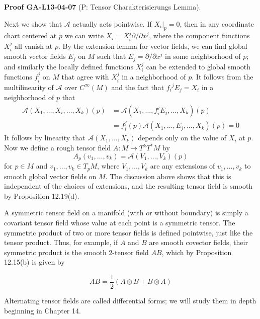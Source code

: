 \documentclass[10pt, letterpaper]{article}
\newcommand{\CustomHeading}[3]{%
  \par\medskip\noindent%
  \textbf{#1 #2} \textnormal{(#3)}.\enskip%
}
\newenvironment{PROOF}[2]{\begin{unitbox}\CustomHeading{Proof}{#1}{#2}}{\end{unitbox}}
\begin{document}
\begin{PROOF}{GA-L13-04-07}{P: Tensor Charakterisierungs Lemma}
Next we show that $\mathscr{A}$ actually acts pointwise. If $\left.X_{i}\right|_{p}=0$, then in any coordinate chart centered at $p$ we can write $X_{i}=X_{i}^{j} \partial / \partial x^{j}$, where the component functions $X_{i}^{j}$ all vanish at $p$. By the extension lemma for vector fields, we can find global smooth vector fields $E_{j}$ on $M$ such that $E_{j}=\partial / \partial x^{j}$ in some neighborhood of $p$; and similarly the locally defined functions $X_{i}^{j}$ can be extended to global smooth functions $f_{i}^{j}$ on $M$ that agree with $X_{i}^{j}$ in a neighborhood of $p$. It follows from the multilinearity of $\mathscr{A}$ over $C^{\infty}(M)$ and the fact that $f_{i}{ }^{j} E_{j}=X_{i}$ in a neighborhood of $p$ that
$$
\begin{aligned}
\mathscr{A}\left(X_{1}, \ldots, X_{i}, \ldots, X_{k}\right)(p) & =\mathscr{A}\left(X_{1}, \ldots, f_{i}^{j} E_{j}, \ldots, X_{k}\right)(p) \\
& =f_{i}^{j}(p) \mathscr{A}\left(X_{1}, \ldots, E_{j}, \ldots, X_{k}\right)(p)=0
\end{aligned}
$$
It follows by linearity that $\mathcal{A}\left(X_{1}, \ldots, X_{k}\right)$ depends only on the value of $X_{i}$ at $p$.\\
Now we define a rough tensor field $A: M \rightarrow T^{k} T^{*} M$ by
$$
A_{p}\left(v_{1}, \ldots, v_{k}\right)=\mathscr{A}\left(V_{1}, \ldots, V_{k}\right)(p)
$$
for $p \in M$ and $v_{1}, \ldots, v_{k} \in T_{p} M$, where $V_{1}, \ldots, V_{k}$ are any extensions of $v_{1}, \ldots, v_{k}$ to smooth global vector fields on $M$. The discussion above shows that this is independent of the choices of extensions, and the resulting tensor field is smooth by Proposition 12.19(d).
\end{PROOF}



A symmetric tensor field on a manifold (with or without boundary) is simply a covariant tensor field whose value at each point is a symmetric tensor. The symmetric product of two or more tensor fields is defined pointwise, just like the tensor product. Thus, for example, if $A$ and $B$ are smooth covector fields, their symmetric product is the smooth 2-tensor field $A B$, which by Proposition 12.15(b) is given by

$$
A B=\frac{1}{2}(A \otimes B+B \otimes A)
$$

Alternating tensor fields are called differential forms; we will study them in depth beginning in Chapter 14.
\end{document}
